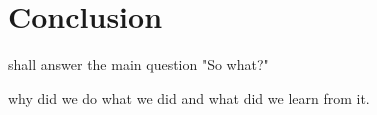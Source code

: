 

\chapter{Conclusion}
\label{chap:conclusion} 


shall answer the main question "So what?"

why did we do what we did and what did we learn from it.
